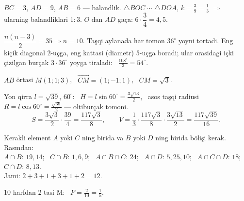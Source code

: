 $BC=3$, $AD=9$, $AB=6$ — balandlik. $\triangle BOC\sim\triangle DOA$, $k=\frac39=\frac13$ $\Rightarrow$ ularning balandliklari $1:3$.
$O$ dan $AD$ gaça: $6\cdot\dfrac34=4{,}5$.

$\dfrac{n(n-3)}2=35\Rightarrow n=10$. Taşqi aylanada har tomon $36^\circ$ yoyni tortadi. Eng kiçik diagonal 2-uçga, eng kattasi (diametr) 5-uçga boradi; ular orasidagi içki çizilgan burçak $3\cdot36^\circ$ yoyga tiraladi: \ $\frac{108^\circ}2=54^\circ$.

$AB$ örtasi $M(1;1;3)$, \ $\overrightarrow{CM}=(1;-1;1)$, \ $CM=\sqrt3$.

Yon qirra $l=\sqrt{39}$, $60^\circ$: \ $H=l\sin60^\circ=\frac{3\sqrt{13}}2$, \ asos taşqi radiusi $R=l\cos60^\circ=\frac{\sqrt{39}}2$ — oltiburçak tomoni.
\[S=\frac{3\sqrt3}2\cdot\frac{39}4=\frac{117\sqrt3}8,\qquad V=\frac13\cdot\frac{117\sqrt3}8\cdot\frac{3\sqrt{13}}2=\frac{117\sqrt{39}}{16}.\]

Kerakli element $A$ yoki $C$ ning birida va $B$ yoki $D$ ning birida bölişi kerak. Rasmdan:\\
$A\cap B$: $19,14$; \ $C\cap B$: $1,6,9$; \ $A\cap B\cap C$: $24$; \ $A\cap D$: $5,25,10$; \ $A\cap C\cap D$: $18$; \ $C\cap D$: $8,13$.\\
Jami: $2+3+1+3+1+2=12$.

10 harfdan 2 tasi M: \ $P=\frac2{10}=\frac15$.

